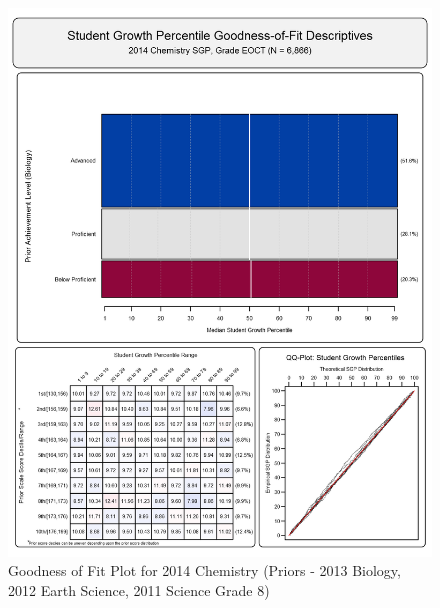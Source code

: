 \documentclass[12pt]{article}
\begin{document}
\begin{figure}[htbp]
\centering
\includegraphics{../img/Goodness_of_Fit/CHEMISTRY.2014/2014_CHEMISTRY_EOCT;2013_BIOLOGY_EOCT;2012_EARTH_SCIENCE_EOCT;2011_SCIENCE_8.png}
\caption{Goodness of Fit Plot for 2014 Chemistry (Priors - 2013 Biology,
2012 Earth Science, 2011 Science Grade 8)}
\end{figure}
\end{document}
